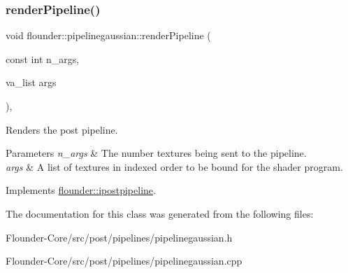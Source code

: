 \mbox{\label{classflounder_1_1pipelinegaussian_ab5416e0179e9b6175c8e59c07300d253}} 
\subsubsection{\texorpdfstring{render\+Pipeline()}{renderPipeline()}}
{\footnotesize\ttfamily void flounder\+::pipelinegaussian\+::render\+Pipeline (\begin{DoxyParamCaption}\item[{const int}]{n\+\_\+args,  }\item[{va\+\_\+list}]{args }\end{DoxyParamCaption})\hspace{0.3cm}{\ttfamily [override]}, {\ttfamily [virtual]}}



Renders the post pipeline. 


\begin{DoxyParams}{Parameters}
{\em n\+\_\+args} & The number textures being sent to the pipeline. \\
\hline
{\em args} & A list of textures in indexed order to be bound for the shader program. \\
\hline
\end{DoxyParams}


Implements \hyperlink{classflounder_1_1ipostpipeline_a25255482fdb75f92b8c3f940ca8c583a}{flounder\+::ipostpipeline}.



The documentation for this class was generated from the following files\+:\begin{DoxyCompactItemize}
\item 
Flounder-\/\+Core/src/post/pipelines/pipelinegaussian.\+h\item 
Flounder-\/\+Core/src/post/pipelines/pipelinegaussian.\+cpp\end{DoxyCompactItemize}
